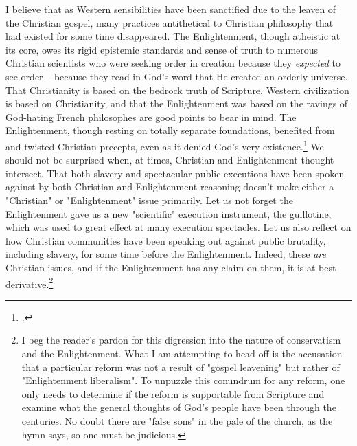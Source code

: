 I believe that as Western sensibilities have been sanctified due to the leaven of the Christian gospel, many practices antithetical to Christian philosophy that had existed for some time disappeared.  The Enlightenment, though atheistic at its core, owes its rigid epistemic standards and sense of truth to numerous Christian scientists who were seeking order in creation because they \textit{expected} to see order -- because they read in God's word that He created an orderly universe. That Christianity is based on the bedrock truth of Scripture, Western civilization is based on Christianity, and that the Enlightenment was based on the ravings of God-hating French philosophes are good points to bear in mind.  The Enlightenment, though resting on totally separate foundations, benefited from and twisted Christian precepts, even as it denied God's very existence.\footcite[\ldots this short, readable book was mentioned by Dr. Robert Godfrey in his \textit{Survey of Church History} series from Ligonier, in the lecture titled \textit{The Enlightenment}. Becker believes that the philosophes were merely secularizing Christian doctrines, recognizing the goodness of the bud, but desiring to cut the flower from its roots nonetheless.]{beckerheavenlycity}  We should not be surprised when, at times, Christian and Enlightenment thought intersect.  That both slavery and spectacular public executions have been spoken against by both Christian and Enlightenment reasoning doesn't make either a "Christian" or "Enlightenment" issue primarily.  Let us not forget the Enlightenment gave us a new "scientific" execution instrument, the guillotine, which was used to great effect at many execution spectacles.  Let us also reflect on how Christian communities have been speaking out against public brutality, including slavery, for some time before the Enlightenment. Indeed, these \textit{are} Christian issues, and if the Enlightenment has any claim on them, it is at best derivative.\footnote{I beg the reader's pardon for this digression into the nature of conservatism and the Enlightenment.  What I am attempting to head off is the accusation that a particular reform was not a result of "gospel leavening" but rather of "Enlightenment liberalism".  To unpuzzle this conundrum for any reform, one only needs to determine if the reform is supportable from Scripture and examine what the general thoughts of God's people have been through the centuries.  No doubt there are "false sons" in the pale of the church, as the hymn says, so one must be judicious.}

